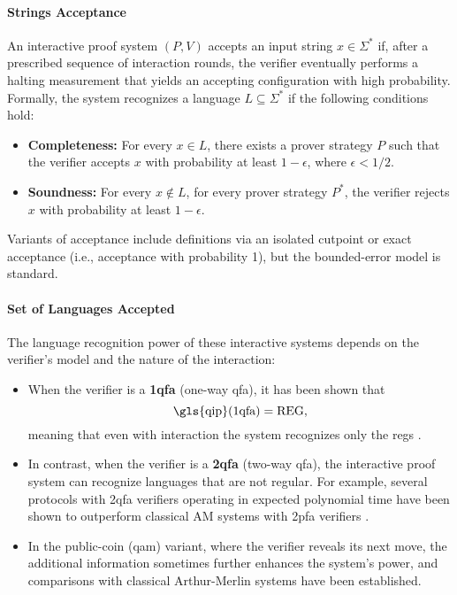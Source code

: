 \paragraph{Strings Acceptance}
An interactive proof system $(P,V)$ accepts an input string $x\in\Sigma^*$ if, after a prescribed sequence of interaction rounds, the verifier eventually performs a halting measurement that yields an accepting configuration with high probability. Formally, the system recognizes a language $L\subseteq\Sigma^*$ if the following conditions hold:
\begin{itemize}
  \item \textbf{Completeness:} For every $x\in L$, there exists a prover strategy $P$ such that the verifier accepts $x$ with probability at least $1-\epsilon$, where $\epsilon<1/2$.
  \item \textbf{Soundness:} For every $x\notin L$, for every prover strategy $P^*$, the verifier rejects $x$ with probability at least $1-\epsilon$.
\end{itemize}
Variants of acceptance include definitions via an isolated cutpoint or exact acceptance (i.e., acceptance with probability 1), but the bounded-error model is standard.

\paragraph{Set of Languages Accepted}
The language recognition power of these interactive systems depends on the verifier's model and the nature of the interaction:
\begin{itemize}
  \item When the verifier is a \textbf{1qfa} (one-way qfa), it has been shown that
  \[
  \text{\gls{qip}(1qfa)} = \text{REG},
  \]
  meaning that even with interaction the system recognizes only the \glspl{reg} \cite{nishimura2009application}.
  \item In contrast, when the verifier is a \textbf{2qfa} (two-way qfa), the interactive proof system can recognize languages that are not regular. For example, several protocols with 2qfa verifiers operating in expected polynomial time have been shown to outperform classical AM systems with 2pfa verifiers \cite{zheng2015power, nishimura2015interactive}.
  \item In the public-coin (\gls{qam}) variant, where the verifier reveals its next move, the additional information sometimes further enhances the system's power, and comparisons with classical Arthur-Merlin systems have been established.
\end{itemize}


